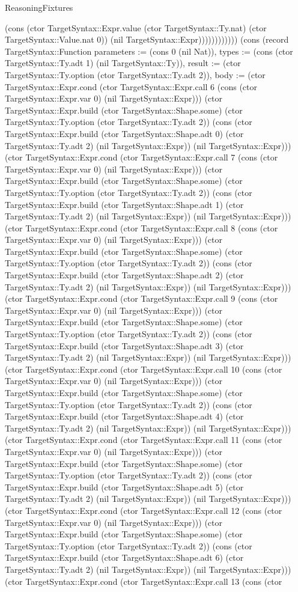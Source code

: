 \begin{lexlean}{ReasoningFixtures}
\begin{semanticmodule}
{(cons (ctor TargetSyntax::Expr.value (ctor TargetSyntax::Ty.nat) (ctor TargetSyntax::Value.nat 0)) (nil TargetSyntax::Expr)))))))))))}) (cons (record TargetSyntax::Function {parameters := (cons 0 (nil Nat)), types := (cons (ctor TargetSyntax::Ty.adt 1) (nil TargetSyntax::Ty)), result := (ctor TargetSyntax::Ty.option (ctor TargetSyntax::Ty.adt 2)), body := (ctor TargetSyntax::Expr.cond (ctor TargetSyntax::Expr.call 6 (cons (ctor TargetSyntax::Expr.var 0) (nil TargetSyntax::Expr))) (ctor TargetSyntax::Expr.build (ctor TargetSyntax::Shape.some) (ctor TargetSyntax::Ty.option (ctor TargetSyntax::Ty.adt 2)) (cons (ctor TargetSyntax::Expr.build (ctor TargetSyntax::Shape.adt 0) (ctor TargetSyntax::Ty.adt 2) (nil TargetSyntax::Expr)) (nil TargetSyntax::Expr))) (ctor TargetSyntax::Expr.cond (ctor TargetSyntax::Expr.call 7 (cons (ctor TargetSyntax::Expr.var 0) (nil TargetSyntax::Expr))) (ctor TargetSyntax::Expr.build (ctor TargetSyntax::Shape.some) (ctor TargetSyntax::Ty.option (ctor TargetSyntax::Ty.adt 2)) (cons (ctor TargetSyntax::Expr.build (ctor TargetSyntax::Shape.adt 1) (ctor TargetSyntax::Ty.adt 2) (nil TargetSyntax::Expr)) (nil TargetSyntax::Expr))) (ctor TargetSyntax::Expr.cond (ctor TargetSyntax::Expr.call 8 (cons (ctor TargetSyntax::Expr.var 0) (nil TargetSyntax::Expr))) (ctor TargetSyntax::Expr.build (ctor TargetSyntax::Shape.some) (ctor TargetSyntax::Ty.option (ctor TargetSyntax::Ty.adt 2)) (cons (ctor TargetSyntax::Expr.build (ctor TargetSyntax::Shape.adt 2) (ctor TargetSyntax::Ty.adt 2) (nil TargetSyntax::Expr)) (nil TargetSyntax::Expr))) (ctor TargetSyntax::Expr.cond (ctor TargetSyntax::Expr.call 9 (cons (ctor TargetSyntax::Expr.var 0) (nil TargetSyntax::Expr))) (ctor TargetSyntax::Expr.build (ctor TargetSyntax::Shape.some) (ctor TargetSyntax::Ty.option (ctor TargetSyntax::Ty.adt 2)) (cons (ctor TargetSyntax::Expr.build (ctor TargetSyntax::Shape.adt 3) (ctor TargetSyntax::Ty.adt 2) (nil TargetSyntax::Expr)) (nil TargetSyntax::Expr))) (ctor TargetSyntax::Expr.cond (ctor TargetSyntax::Expr.call 10 (cons (ctor TargetSyntax::Expr.var 0) (nil TargetSyntax::Expr))) (ctor TargetSyntax::Expr.build (ctor TargetSyntax::Shape.some) (ctor TargetSyntax::Ty.option (ctor TargetSyntax::Ty.adt 2)) (cons (ctor TargetSyntax::Expr.build (ctor TargetSyntax::Shape.adt 4) (ctor TargetSyntax::Ty.adt 2) (nil TargetSyntax::Expr)) (nil TargetSyntax::Expr))) (ctor TargetSyntax::Expr.cond (ctor TargetSyntax::Expr.call 11 (cons (ctor TargetSyntax::Expr.var 0) (nil TargetSyntax::Expr))) (ctor TargetSyntax::Expr.build (ctor TargetSyntax::Shape.some) (ctor TargetSyntax::Ty.option (ctor TargetSyntax::Ty.adt 2)) (cons (ctor TargetSyntax::Expr.build (ctor TargetSyntax::Shape.adt 5) (ctor TargetSyntax::Ty.adt 2) (nil TargetSyntax::Expr)) (nil TargetSyntax::Expr))) (ctor TargetSyntax::Expr.cond (ctor TargetSyntax::Expr.call 12 (cons (ctor TargetSyntax::Expr.var 0) (nil TargetSyntax::Expr))) (ctor TargetSyntax::Expr.build (ctor TargetSyntax::Shape.some) (ctor TargetSyntax::Ty.option (ctor TargetSyntax::Ty.adt 2)) (cons (ctor TargetSyntax::Expr.build (ctor TargetSyntax::Shape.adt 6) (ctor TargetSyntax::Ty.adt 2) (nil TargetSyntax::Expr)) (nil TargetSyntax::Expr))) (ctor TargetSyntax::Expr.cond (ctor TargetSyntax::Expr.call 13 (cons (ctor }
\end{semanticmodule}
\end{lexlean}
